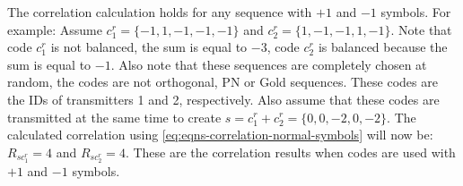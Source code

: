 %


The correlation calculation holds for any sequence with $+1$ and $-1$ symbols.
For example: Assume $c^r_1 = \{ -1, 1, -1, -1, -1 \}$ and $c^r_2 = \{ 1, -1, -1, 1, -1 \}$.
Note that code $c^r_1$ is not balanced, the sum is equal to $-3$, code $c^r_2$ is balanced because the sum is equal to $-1$.
Also note that these sequences are completely chosen at random, the codes are not orthogonal, PN or Gold sequences.
These codes are the IDs of transmitters 1 and 2, respectively.
Also assume that these codes are transmitted at the same time to create $s = c^r_1 + c^r_2 = \{ 0, 0, -2, 0, -2 \}$.
The calculated correlation using \autoref{eq:eqns-correlation-normal-symbols} will now be: $R_{sc^r_{1}} = 4$ and $R_{sc^r_{2}} = 4$.
These are the correlation results when codes are used with $+1$ and $-1$ symbols.

